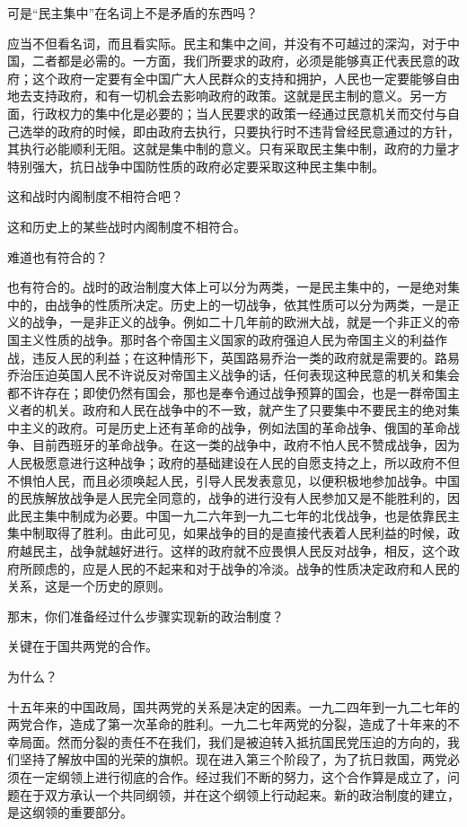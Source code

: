 可是“民主集中”在名词上不是矛盾的东西吗？

应当不但看名词，而且看实际。民主和集中之间，并没有不可越过的深沟，对于中国，二者都是必需的。一方面，我们所要求的政府，必须是能够真正代表民意的政府；这个政府一定要有全中国广大人民群众的支持和拥护，人民也一定要能够自由地去支持政府，和有一切机会去影响政府的政策。这就是民主制的意义。另一方面，行政权力的集中化是必要的；当人民要求的政策一经通过民意机关而交付与自己选举的政府的时候，即由政府去执行，只要执行时不违背曾经民意通过的方针，其执行必能顺利无阻。这就是集中制的意义。只有采取民主集中制，政府的力量才特别强大，抗日战争中国防性质的政府必定要采取这种民主集中制。

这和战时内阁制度不相符合吧？

这和历史上的某些战时内阁制度不相符合。

难道也有符合的？

也有符合的。战时的政治制度大体上可以分为两类，一是民主集中的，一是绝对集中的，由战争的性质所决定。历史上的一切战争，依其性质可以分为两类，一是正义的战争，一是非正义的战争。例如二十几年前的欧洲大战，就是一个非正义的帝国主义性质的战争。那时各个帝国主义国家的政府强迫人民为帝国主义的利益作战，违反人民的利益；在这种情形下，英国路易乔治一类的政府就是需要的。路易乔治压迫英国人民不许说反对帝国主义战争的话，任何表现这种民意的机关和集会都不许存在；即使仍然有国会，那也是奉令通过战争预算的国会，也是一群帝国主义者的机关。政府和人民在战争中的不一致，就产生了只要集中不要民主的绝对集中主义的政府。可是历史上还有革命的战争，例如法国的革命战争、俄国的革命战争、目前西班牙的革命战争。在这一类的战争中，政府不怕人民不赞成战争，因为人民极愿意进行这种战争；政府的基础建设在人民的自愿支持之上，所以政府不但不惧怕人民，而且必须唤起人民，引导人民发表意见，以便积极地参加战争。中国的民族解放战争是人民完全同意的，战争的进行没有人民参加又是不能胜利的，因此民主集中制成为必要。中国一九二六年到一九二七年的北伐战争，也是依靠民主集中制取得了胜利。由此可见，如果战争的目的是直接代表着人民利益的时候，政府越民主，战争就越好进行。这样的政府就不应畏惧人民反对战争，相反，这个政府所顾虑的，应是人民的不起来和对于战争的冷淡。战争的性质决定政府和人民的关系，这是一个历史的原则。

那末，你们准备经过什么步骤实现新的政治制度？

关键在于国共两党的合作。

为什么？

十五年来的中国政局，国共两党的关系是决定的因素。一九二四年到一九二七年的两党合作，造成了第一次革命的胜利。一九二七年两党的分裂，造成了十年来的不幸局面。然而分裂的责任不在我们，我们是被迫转入抵抗国民党压迫的方向的，我们坚持了解放中国的光荣的旗帜。现在进入第三个阶段了，为了抗日救国，两党必须在一定纲领上进行彻底的合作。经过我们不断的努力，这个合作算是成立了，问题在于双方承认一个共同纲领，并在这个纲领上行动起来。新的政治制度的建立，是这纲领的重要部分。

